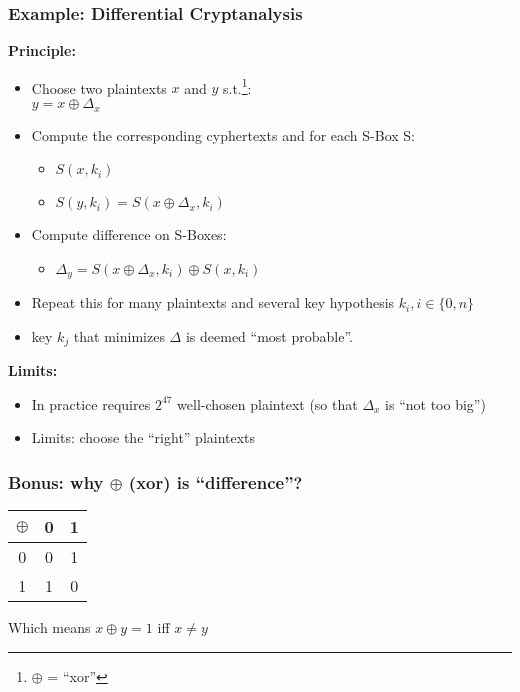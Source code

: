 \documentclass[
hyperref={pdfpagelabels=false}
,xcolor=table
]
{beamer}
\newcommand{\minus}{{\texttt{[image: minus.png]}}}
\begin{document}
\begin{frame}
  \frametitle{Example: Differential Cryptanalysis}
  
  \textbf{Principle:}
  \begin{itemize}
  \item Choose two plaintexts $x$ and $y$ s.t.\footnote{$\oplus$ = ``xor''}: \\
    $y = x \oplus \Delta_x$ 
  \item Compute the corresponding cyphertexts and for each S-Box S: 
    \begin{itemize}
    \item $S(x,k_i)$
    \item $S(y,k_i) = S(x \oplus \Delta_x,k_i)$
    \end{itemize}
  \item Compute difference on S-Boxes:
    \begin{itemize}
    \item $\Delta_y = S(x \oplus \Delta_x,k_i) \oplus S(x,k_i)$
    \end{itemize}
  \item Repeat this for many plaintexts and several key hypothesis $k_i, i \in \{0, n\}$
  \item key $k_j$ that minimizes $\Delta$ is deemed ``most probable''.
  \end{itemize}

  \textbf{Limits: }
  \begin{itemize}
  \item[\minus] In practice requires $2^{47}$ well-chosen plaintext (so that $\Delta_x$ is ``not too big'')
  \item[\minus] Limits: choose the ``right'' plaintexts
  \end{itemize}
\end{frame}


\begin{frame}
  \frametitle{Bonus: why $\oplus$ (xor) is ``difference''? }

  \begin{tabular}{c|c|c}
    $\oplus$ & 0 & 1 \\\hline
    0        & 0 & 1 \\\hline
    1        & 1 & 0 \\
  \end{tabular}

  \bigskip
  
  Which means $x \oplus y = 1 $ iff $x \neq y$
  
\end{frame}
\end{document}
